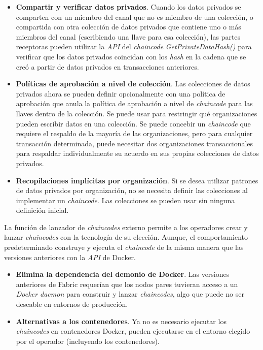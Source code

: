 {\begin{itemize}
\item {\bf Compartir y verificar datos privados}. Cuando los datos privados se comparten con un miembro del canal que no es miembro de una colecci\'on, o compartida con otra colecci\'on de datos privados que contiene uno o m\'as miembros del canal (escribiendo una llave para esa colecci\'on), las partes receptoras pueden utilizar la \emph{API} del \emph{chaincode} \emph{GetPrivateDataHash()} para verificar que los datos privados coincidan con los \emph{hash} en la cadena que se cre\'o a partir de datos privados en transacciones anteriores.

\item {\bf Pol\'iticas de aprobaci\'on a nivel de colecci\'on}. Las colecciones de datos privados ahora se pueden definir opcionalmente con una pol\'itica de aprobaci\'on que anula la pol\'itica de aprobaci\'on a nivel de \emph{chaincode} para las llaves dentro de la colecci\'on. Se puede usar para restringir qu\'e organizaciones pueden escribir datos en una colecci\'on. Se puede concebir un \emph{chaincode} que requiere el respaldo de la mayor\'ia de las organizaciones, pero para cualquier transacci\'on determinada, puede necesitar dos organizaciones transaccionales para respaldar individualmente su acuerdo en sus propias colecciones de datos privados.

\item {\bf Recopilaciones impl\'icitas por organizaci\'on}. Si se desea utilizar patrones de datos privados por organizaci\'on, no se necesita definir las colecciones al implementar un \emph{chaincode}. Las colecciones se pueden usar sin ninguna definici\'on inicial.
\end{itemize}

La funci\'on de lanzador de \emph{chaincodes} externo permite a los operadores crear y lanzar \emph{chaincodes} con la tecnolog\'ia de su elecci\'on. Aunque, el comportamiento predeterminado construye y ejecuta el \emph{chaincode} de la misma manera que las versiones anteriores con la \emph{API} de Docker.

\begin{itemize}
\item {\bf Elimina la dependencia del demonio de Docker}. Las versiones anteriores de Fabric requer\'ian que los nodos pares tuvieran acceso a un \emph{Docker daemon}  para construir y lanzar \emph{chaincodes}, algo que puede no ser deseable en entornos de producci\'on.

\item {\bf Alternativas a los contenedores}. Ya no es necesario ejecutar los \emph{chaincodes} en contenedores Docker, pueden ejecutarse en el entorno elegido por el operador (incluyendo los contenedores).



\end{itemize}}
